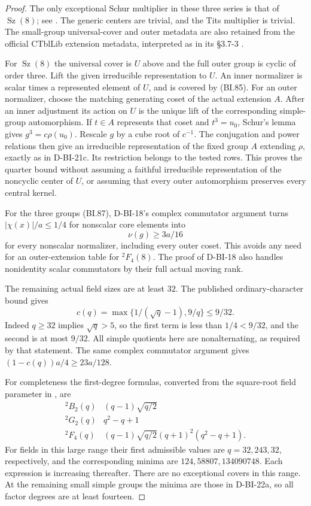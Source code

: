 \begin{proof}
The only exceptional Schur multiplier in these three series is
that of $\operatorname{Sz}(8)$; see
\cite[Chapter~5, Table~1, numbered p.~35]{BI:HHM}.
The generic centers are trivial, and the Tits multiplier is trivial.
The small-group universal-cover and outer metadata are also
retained from the official CTblLib extension metadata, interpreted
as in its \S3.7-3 \cite{SPOR:CTblLib}.

For $\operatorname{Sz}(8)$ the universal cover is $U$ above and
the full outer group is cyclic of order three.  Lift the given
irreducible representation to $U$.  An inner normalizer is scalar
times a represented element of $U$, and is covered by (BI.85).
For an outer normalizer, choose the matching generating coset of
the actual extension $A$.  After an inner adjustment its action
on $U$ is the unique lift of the corresponding simple-group
automorphism.  If $t\in A$ represents that coset and $t^3=u_0$,
Schur's lemma gives $g^3=c\rho(u_0)$.  Rescale $g$ by a cube
root of $c^{-1}$.  The conjugation and power relations then give
an irreducible representation of the fixed group $A$ extending
$\rho$, exactly as in D-BI-21c.  Its restriction belongs to the
tested rows.  This proves the quarter bound without assuming a
faithful irreducible representation of the noncyclic center of $U$,
or assuming that every outer automorphism preserves every central
kernel.

For the three groups (BI.87), D-BI-18's complex commutator
argument turns $|\chi(x)|/a\le1/4$ for nonscalar core elements
into
\[
                              \nu(g)\ge3a/16
\]
for every nonscalar normalizer, including every outer coset.
This avoids any need for an outer-extension table for
${}^2F_4(8)$.  The proof of D-BI-18 also handles nonidentity
scalar commutators by their full actual moving rank.

The remaining actual field sizes are at least $32$.
The published ordinary-character bound
\cite[Theorem~4.1(2), p.~141]{BI:DHP} gives
\[
 c(q)=\max\{1/(\sqrt q-1),9/q\}\le9/32.
\]
Indeed $q\ge32$ implies $\sqrt q>5$, so the first term is
less than $1/4<9/32$, and the second is at most $9/32$.
All simple quotients here are nonalternating, as required by
that statement.  The same complex commutator argument gives
$(1-c(q))a/4\ge23a/128$.

For completeness the first-degree formulas, converted from
the square-root field parameter in
\cite[\S\S5.1,5.2,5.5, numbered pp.~9,14--15]{BI:Luebeck},
are
\[
\begin{array}{c|c}
{}^2B_2(q)&(q-1)\sqrt{q/2}\\
{}^2G_2(q)&q^2-q+1\\
{}^2F_4(q)&(q-1)\sqrt{q/2}(q+1)^2(q^2-q+1).
\end{array}                                                   \tag{BI.89}
\]
For fields in this large range their first admissible values are
$q=32,243,32$, respectively, and the corresponding minima are
$124,58807,134090748$.  Each expression is increasing thereafter.
There are no exceptional covers in this range.  At the remaining
small simple groups the minima are those in D-BI-22a, so all
factor degrees are at least fourteen.


\end{proof}
